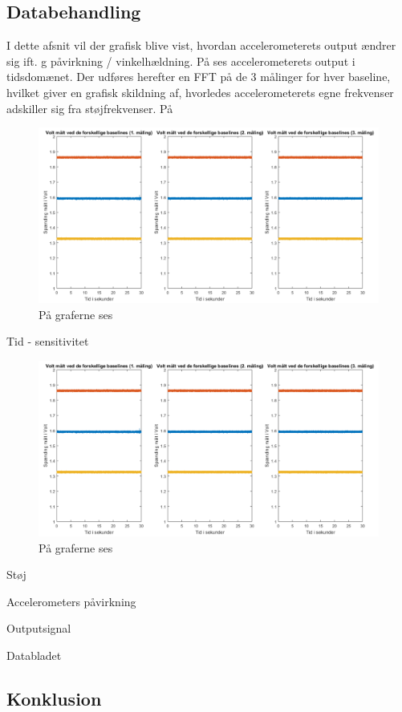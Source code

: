 \subsection{Databehandling}
I dette afsnit vil der grafisk blive vist, hvordan accelerometerets output ændrer sig ift. g påvirkning / vinkelhældning. På  ses accelerometerets output i tidsdomænet. Der udføres herefter en FFT på de 3 målinger for hver baseline, hvilket giver en grafisk skildning af, hvorledes accelerometerets egne frekvenser adskiller sig fra støjfrekvenser. På 

\begin{figure}[H]
	\centering
	\includegraphics[scale=0.14]{figures/cProblemloesning/Pilotforsoeg_Tid.png}
	\caption{På graferne ses}
	\label{Fig:PilotTid}
\end{figure}

Tid - sensitivitet

\begin{figure}[H]
	\centering
	\includegraphics[scale=0.14]{figures/cProblemloesning/Pilotforsoeg_Tid.png}
	\caption{På graferne ses}
	\label{Fig:Pilot_FFT}
\end{figure}

Støj

Accelerometers påvirkning

Outputsignal

Databladet

\subsection{Konklusion}

\cite{Devices2009}